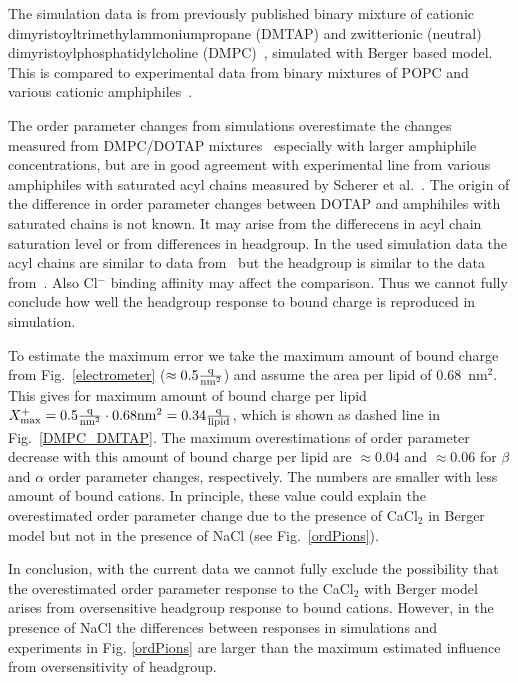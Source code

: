 \documentclass[pre,aps,floatfix,authordate1-4,twocolumn]{revtex4-1}
\begin{document}
The simulation data is from previously published binary mixture of cationic dimyristoyltrimethylammoniumpropane (DMTAP) 
and zwitterionic (neutral) dimyristoylphosphatidylcholine (DMPC)~\cite{miettinen09,DMPC_DMTAP0mol,DMPC_DMTAP6mol,DMPC_DMTAP50mol},
simulated with Berger based model. This is compared to experimental data from binary mixtures of POPC and
various cationic amphiphiles~\cite{scherer89,franzin98}.

The order parameter changes from simulations overestimate the changes measured from DMPC/DOTAP mixtures~\cite{franzin98} 
especially with larger amphiphile concentrations, but are in good agreement with experimental line from various amphiphiles
with saturated acyl chains measured by Scherer et al.~\cite{scherer89}. The origin of the difference in order parameter 
changes between DOTAP and amphihiles with saturated chains is not known. It may arise from the differecens in acyl chain saturation level or 
from differences in headgroup. In the used simulation data the acyl chains are similar to data from~\cite{scherer89} but the headgroup is 
similar to the data from~\cite{franzin98}. Also Cl$^-$ binding affinity may affect the comparison.
Thus we cannot fully conclude how well the headgroup response to bound charge is reproduced in simulation. 

To estimate the maximum error we take the maximum amount of bound charge from Fig.~\ref{electrometer} ($\approx 0.5\frac{\rm q}{\rm nm^2}$)
and assume the area per lipid of 0.68~nm$^2$. This gives for maximum amount of bound 
charge per lipid $X^+_{\rm max}=0.5\frac{\rm q}{\rm nm^2}\cdot 0.68{\rm nm}^2=0.34\frac{\rm q}{\rm lipid}$,
which is shown as dashed line in Fig.~\ref{DMPC_DMTAP}. The maximum
overestimations of order parameter decrease with this amount of bound charge per lipid are $\approx$0.04 and $\approx$0.06 for $\beta$ and $\alpha$ order parameter changes, respectively.
The numbers are smaller with less amount of bound cations. In principle,
these value could explain the overestimated order parameter change due to the presence of CaCl$_2$ in Berger model but not in the presence
of NaCl (see Fig.~\ref{ordPions}).

In conclusion, with the current data we cannot fully exclude the possibility that the overestimated order parameter response to the
CaCl$_2$ with Berger model arises from oversensitive headgroup response to bound cations. However, in the presence of NaCl
the differences between responses in simulations and experiments in Fig. \ref{ordPions} are larger than the maximum estimated 
influence from oversensitivity of headgroup. 
\end{document}
